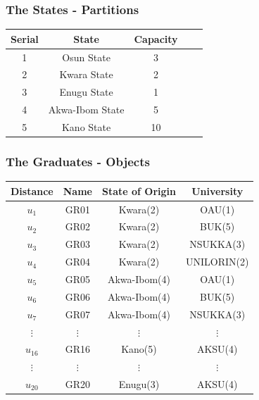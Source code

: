 \documentclass[10pt]{beamer}
\begin{document}
			\begin{frame}
				\frametitle{The States - Partitions}
				\begin{center}
					\begin{tabular}{|c|c|c|c|c|}
						\hline
						\textbf{Serial} & \textbf{State} & \textbf{Capacity} \\
						\hline
						1 & Osun State & 3\\
						\hline
						2 & Kwara State & 2\\
						\hline
						3 & Enugu State & 1\\
						\hline
						4 & Akwa-Ibom State & 5\\
						\hline
						5 & Kano State & 10\\
						\hline
					\end{tabular}		
				\end{center}
			\end{frame}
			\begin{frame}
				\frametitle{The Graduates - Objects}				
				\begin{center}
					\begin{tabular}{|c|c|c|c|}
						\hline
						\textbf{Distance} & \textbf{Name} & \textbf{State of Origin} & \textbf{University}\\
						\hline
						$u_{1}$ & GR01 & Kwara(2) & OAU(1)\\
						\hline
						$u_{2}$ & GR02 & Kwara(2) & BUK(5)\\
						\hline
						$u_{3}$ & GR03 & Kwara(2) & NSUKKA(3)\\
						\hline
						$u_{4}$ & GR04 & Kwara(2) & UNILORIN(2)\\
						\hline
						$u_{5}$ & GR05 & Akwa-Ibom(4) & OAU(1)\\
						\hline
						$u_{6}$ & GR06 & Akwa-Ibom(4) & BUK(5)\\
						\hline
						$u_{7}$ & GR07 & Akwa-Ibom(4) & NSUKKA(3)\\
						\hline
						$\vdots $ & $\vdots $ & $\vdots $ & $\vdots $ \\
						\hline
						$u_{16}$ & GR16 & Kano(5) & AKSU(4)\\
						\hline
						$\vdots $ & $\vdots $ & $\vdots $ & $\vdots $ \\
						\hline
						$u_{20}$ & GR20 & Enugu(3) & AKSU(4)\\
						\hline
					\end{tabular}		
				\end{center}
			\end{frame}
\end{document}
